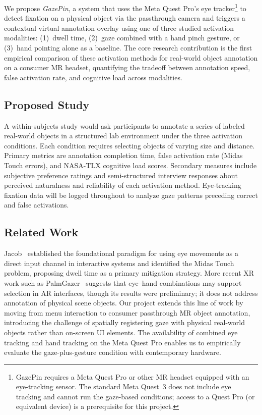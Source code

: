 \documentclass{styling/vgtc}                          %
\begin{document}
We propose \emph{GazePin}, a system that uses the Meta Quest Pro's eye
tracker\footnote{GazePin requires a Meta Quest Pro or other MR headset equipped with
an eye-tracking sensor. The standard Meta Quest~3 does not include eye tracking and
cannot run the gaze-based conditions; access to a Quest Pro (or equivalent device) is a
prerequisite for this project.} to detect fixation on a physical object via the passthrough camera
and triggers a contextual virtual annotation overlay using one of three
studied activation modalities: (1)~dwell time, (2)~gaze combined with a
hand pinch gesture, or (3)~hand pointing alone as a baseline. The core
research contribution is the first empirical comparison of these activation
methods for real-world object annotation on a consumer MR headset,
quantifying the tradeoff between annotation speed, false activation rate,
and cognitive load across modalities.

\subsection{Proposed Study}

A within-subjects study would ask participants to annotate a
series of labeled real-world objects in a structured lab environment under
the three activation conditions. Each condition requires selecting objects
of varying size and distance. Primary metrics are annotation completion
time, false activation rate (Midas Touch errors), and NASA-TLX cognitive
load scores. Secondary measures include subjective preference ratings and
semi-structured interview responses about perceived naturalness and
reliability of each activation method. Eye-tracking fixation data will be
logged throughout to analyze gaze patterns preceding correct and false
activations.

\subsection{Related Work}

Jacob~\cite{jacob:1991:eye} established the foundational paradigm for using
eye movements as a direct input channel in interactive systems and identified
the Midas Touch problem, proposing dwell time as a primary mitigation
strategy. More recent XR work such as PalmGazer~\cite{pfeuffer2023palmgazer}
suggests that eye--hand combinations may support selection in
AR interfaces, though its results were preliminary; it does not address annotation of physical scene objects.
Our project extends this line of work by moving from menu interaction to
consumer passthrough MR object annotation, introducing the challenge of
spatially registering gaze with physical real-world objects rather than
on-screen UI elements. The availability of combined eye tracking and hand
tracking on the Meta Quest Pro enables us to empirically evaluate the
gaze-plus-gesture condition with contemporary hardware.
\end{document}
